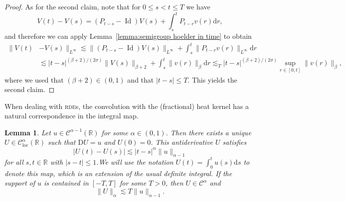 \documentclass[11pt,a4paper]{article}
\newcommand{\mathD}{\mathrm{D}}
\newcommand{\mathd}{\mathrm{d}}
\newcommand{\tmop}[1]{\ensuremath{\operatorname{#1}}}
\newtheorem{lemma}[theorem]{Lemma}
\theoremstyle{remark}
\newcommand{\CC}{\ensuremath{\mathscr{C}}}
\begin{document}
\begin{proof}
  As for the second claim, note that for $0 \leqslant s<t \leqslant T$ we have
  \[
      V ( t ) -V ( s ) = ( P_{t-s} - \tmop{Id} ) V ( s ) + \int_{s}^{t} P_{t-r} v ( r ) \mathd r,
  \]
  and therefore we can apply Lemma~\ref{lemma:semigroup hoelder in time} to obtain
  \begin{align*}
     \| V ( t ) &-V ( s ) \|_{L^{\infty}}  \lesssim \| ( P_{t-s} - \tmop{Id} ) V( s ) \|_{L^{\infty}} + \int_{s}^{t} \| P_{t-r} v ( r ) \|_{L^{\infty}} \mathd r \\
     & \lesssim | t-s |^{( \beta +2 ) / ( 2 \sigma )} \| V ( s ) \|_{\beta +2} +  \int_{s}^{t} \| v ( r ) \|_{\beta} \mathd r \lesssim_{T} | t-s |^{( \beta +2 ) / ( 2 \sigma )} \sup_{r \in [ 0,t ]} \| v ( r ) \|_{\beta} ,
  \end{align*}
  where we used that $( \beta +2 ) \in ( 0,1 )$ and that $| t-s | \leqslant T$. This yields the second claim.
\end{proof}

When dealing with \textsc{rde}s, the convolution with the (fractional) heat kernel has a natural correspondence in the integral map.

\begin{lemma}\label{lemma:integral}
  Let $u \in \CC^{\alpha -1} ( \mathbb{R} )$ for some $\alpha \in ( 0,1 )$. Then there exists a unique $U \in \CC^{\alpha}_{\tmop{loc}} ( \mathbb{R} )$ such that $\mathD U=u$ and $U ( 0
  ) =0$. This antiderivative $U$ satisfies
  \begin{equation}\label{eq:integral estimate 1}
     | U ( t ) -U ( s ) | \lesssim | t-s |^{\alpha} \| u \|_{\alpha -1}
  \end{equation}
  for all $s,t \in \mathbb{R}$ with $| s-t | \leqslant 1$.We will use the notation $U ( t ) = \int_{0}^{t} u ( s ) \mathd s$ to denote this map, which is an extension of the usual definite integral. If the support of $u$ is contained in $[ -T,T ]$ for some $T>0$, then $U \in \CC^{\alpha}$ and
  \[
     \| U \|_{\alpha} \lesssim T \| u \|_{\alpha -1}.
  \]
\end{lemma}
\end{document}
